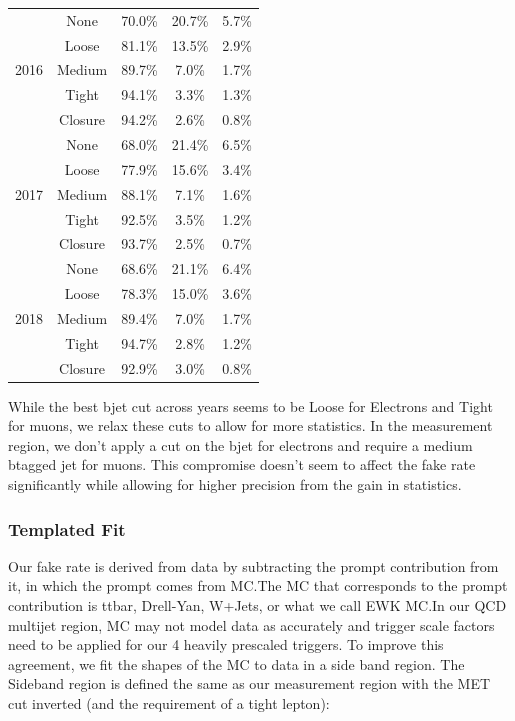 \begin{table}
\begin{tabular}{c c c c c}
    \multirow{5}{*}{2016} & None    & 70.0\% & 20.7\% & 5.7\%   \\
                          & Loose   & 81.1\% & 13.5\% & 2.9\%   \\
                          & Medium  & 89.7\% & 7.0\% & 1.7\%      \\
                          & Tight   & 94.1\% & 3.3\% & 1.3\%      \\
                          & Closure & 94.2\% & 2.6\%  & 0.8\%   \\
    \hline
    \multirow{5}{*}{2017} & None    & 68.0\% & 21.4\% & 6.5\%   \\
                          & Loose   & 77.9\% & 15.6\% & 3.4\%   \\
                          & Medium  & 88.1\% & 7.1\%  & 1.6\%   \\
                          & Tight   & 92.5\% & 3.5\%  & 1.2\%   \\
                          & Closure & 93.7\% & 2.5\%  & 0.7\%   \\
    \hline
    \multirow{5}{*}{2018} & None    & 68.6\% & 21.1\% & 6.4\%   \\
                          & Loose   & 78.3\% & 15.0\% & 3.6\%   \\
                          & Medium  & 89.4\% & 7.0\%  & 1.7\%   \\
                          & Tight   & 94.7\% & 2.8\%  & 1.2\%   \\
                          & Closure & 92.9\% & 3.0\%  & 0.8\%   \\
    \hline
  \end{tabular}
\end{table}
While the best bjet cut across years seems to be Loose for Electrons and Tight for muons, we relax these cuts to allow for more statistics. In the measurement region, we don't apply a cut on the bjet for electrons and require a medium btagged jet for muons. This compromise doesn't seem to affect the fake rate significantly while allowing for higher precision from the gain in statistics.

\subsubsection{Templated Fit}\label{sec:nonprompt:template_fit}
Our fake rate is derived from data by subtracting the prompt contribution from it, in which the prompt comes from MC.\@ The MC that corresponds to the prompt contribution is ttbar, Drell-Yan, W+Jets, or what we call EWK MC.\@ In our QCD multijet region, MC may not model data as accurately and trigger scale factors need to be applied for our 4 heavily prescaled triggers. To improve this agreement, we fit the shapes of the MC to data in a side band region. The Sideband region is defined the same as our measurement region with the MET cut inverted (and the requirement of a tight lepton):

